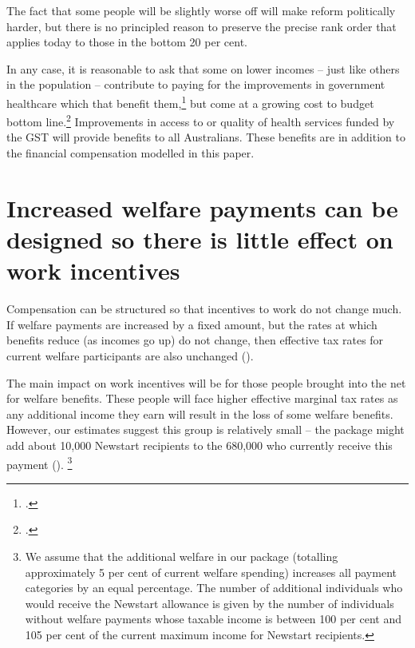 The fact that some people will be slightly worse off will make reform politically harder, but there is no principled reason to preserve the precise rank order that applies today to those in the bottom 20 per cent.

In any case, it is reasonable to ask that some on lower incomes – just like others in the population – contribute to paying for the improvements in government healthcare which that benefit them,\footcite[][14]{Deloitte2015TaxReformSheddingLight}  but come at a growing cost to budget bottom line.\footcite[][20]{DaleyWoodWeidmannEtAl2014}  Improvements in access to or quality of health services funded by the GST will provide benefits to all Australians. These benefits are in addition to the financial compensation modelled in this paper.

\section{Increased welfare payments can be designed so there is little effect on work incentives\label{sec:GST-3-3}}
Compensation can be structured so that incentives to work do not change much. If welfare payments are increased by a fixed amount, but the rates at which benefits reduce (as incomes go up) do not change, then effective tax rates for current welfare participants are also unchanged ().

The main impact on work incentives will be for those people brought into the net for welfare benefits. These people will face higher effective marginal tax rates as any additional income they earn will result in the loss of some welfare benefits. However, our estimates suggest this group is relatively small – the package might add about 10,000 Newstart recipients to the 680,000 who currently receive this payment ().%
\footnote{We assume that the additional welfare in our package (totalling approximately 5 per cent of current welfare spending) increases all payment categories by an equal percentage. The number of additional individuals who would receive the Newstart allowance is given by the number of individuals without welfare payments whose taxable income is between 100 per cent and 105 per cent of the current maximum income for Newstart recipients.}   

